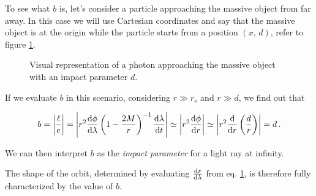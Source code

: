 To see what $b$ is, let's consider a particle approaching the massive object
from far away. In this case we will use Cartesian coordinates and say that the 
massive object is at the origin while the particle starts from a position
$(x, \, d)$, refer to figure \ref{cap1:fig:b}.

\begin{figure}[h]
\centering
{}
\caption{Visual representation of a photon approaching the massive object
with an impact parameter $d$.}
\label{cap1:fig:b}
\end{figure}

If we evaluate $b$ in this scenario, considering $r \gg r_s$ and $r \gg d$, we
find out that

\begin{equation*}
    b = \abs{\frac{\ell}{e}}
    = \abs{r^2 \dv{\phi}{\lambda} \left(1-\frac{2M}{r}\right)^{-1}\dv{\lambda}{t}}
    \simeq \abs{r^2 \dv{\phi}{r}}
    \simeq \abs{r^2 \dv{}{r} \left(\frac{d}{r}\right)}
    = d \, . 
\end{equation*}

We can then interpret $b$ as the \textit{impact parameter} for a light ray at
infinity.

The shape of the orbit, determined by evaluating $\dv{r}{\lambda}$ from eq.
\ref{cap1:fig:b}, is therefore fully characterized by the value of $b$.


